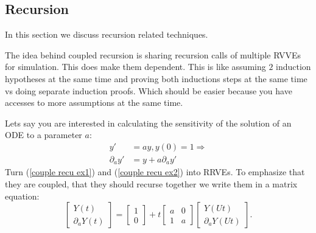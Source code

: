\documentclass[a4paper,12pt]{article}
\begin{document}
\subsection{Recursion}
In this section we discuss recursion related techniques.

\begin{technique}
    The idea behind coupled recursion is sharing recursion calls of
    multiple RVVEs for simulation. This does make them dependent.
    This is like assuming $2$ induction hypotheses at the same
    time and proving both inductions steps at the same time vs
    doing separate induction proofs. Which should be easier
    because you have accesses to more assumptions at the same time.
\end{technique}

\begin{example}
    Lets say you are interested in calculating the
    sensitivity of the solution of an ODE to a
    parameter $a$:
    \begin{align}
        y'             & =ay,y(0)=1 \Rightarrow \label{couple recu ex1} \\
        \partial_{a}y' & = y + a \partial_{a}y' \label{couple recu ex2}
    \end{align}
    Turn (\ref{couple recu ex1}) and (\ref{couple recu ex2}) into RRVEs.
    To emphasize that they are coupled, that they should
    recurse together we write them in a matrix equation:
    \begin{equation} \label{coupled mat}
        \begin{bmatrix}
            Y(t) \\
            \partial_{a}Y(t)
        \end{bmatrix}=
        \begin{bmatrix}
            1 \\
            0
        \end{bmatrix}+
        t \begin{bmatrix}
            a & 0 \\
            1 & a
        \end{bmatrix}
        \begin{bmatrix}
            Y(Ut) \\
            \partial_{a}Y(Ut)
        \end{bmatrix}.
    \end{equation}

\end{example}
\end{document}
